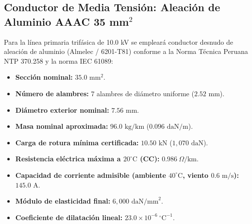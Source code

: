 \subsection{Conductor de Media Tensión: Aleación de Aluminio AAAC 35 mm$^2$}
Para la línea primaria trifásica de 10.0 kV se empleará conductor desnudo de aleación de aluminio (Almelec / 6201-T81) conforme a la Norma Técnica Peruana NTP 370.258 y la norma IEC 61089:
\begin{itemize}
  \item \textbf{Sección nominal:} $35.0\text{ mm}^2$.
  \item \textbf{Número de alambres:} 7 alambres de diámetro uniforme ($2.52\text{ mm}$).
  \item \textbf{Diámetro exterior nominal:} $7.56\text{ mm}$.
  \item \textbf{Masa nominal aproximada:} $96.0\text{ kg/km}$ ($0.096\text{ daN/m}$).
  \item \textbf{Carga de rotura mínima certificada:} $10.50\text{ kN}$ ($1,070\text{ daN}$).
  \item \textbf{Resistencia eléctrica máxima a $20^\circ\text{C}$ (CC):} $0.986\ \Omega/\text{km}$.
  \item \textbf{Capacidad de corriente admisible (ambiente $40^\circ\text{C}$, viento $0.6\text{ m/s}$):} $145.0\text{ A}$.
  \item \textbf{Módulo de elasticidad final:} $6,000\text{ daN/mm}^2$.
  \item \textbf{Coeficiente de dilatación lineal:} $23.0 \times 10^{-6}\ ^\circ\text{C}^{-1}$.
\end{itemize}

